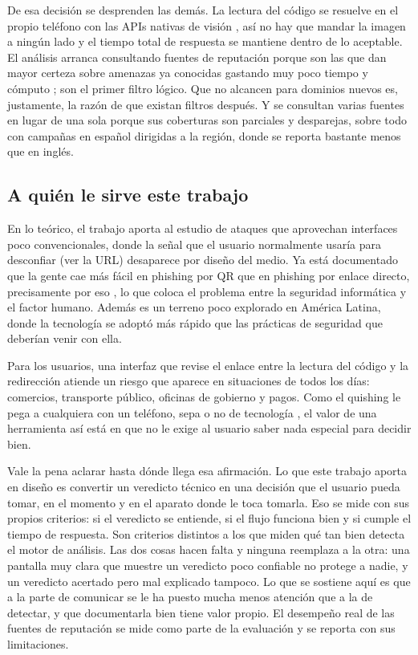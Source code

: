 De esa decisión se desprenden las demás. La lectura del código se resuelve en el
propio teléfono con las APIs nativas de visión
\cite{apple_vndetectbarcodes,google_mlkit_barcode,rousavy_visioncamera}, así no hay
que mandar la imagen a ningún lado y el tiempo total de respuesta se mantiene dentro
de lo aceptable. El análisis arranca consultando fuentes de reputación porque son las
que dan mayor certeza sobre amenazas ya conocidas gastando muy poco tiempo y cómputo
\cite{google_safebrowsing,virustotal_apiv3,phishtank_devinfo}; son el primer filtro
lógico. Que no alcancen para dominios nuevos es, justamente, la razón de que existan
filtros después. Y se consultan varias fuentes en lugar de una sola porque sus
coberturas son parciales y desparejas, sobre todo con campañas en español dirigidas a
la región, donde se reporta bastante menos que en inglés.

\subsection*{A quién le sirve este trabajo}

En lo teórico, el trabajo aporta al estudio de ataques que aprovechan interfaces poco
convencionales, donde la señal que el usuario normalmente usaría para desconfiar (ver
la URL) desaparece por diseño del medio. Ya está documentado que la gente cae más
fácil en phishing por QR que en phishing por enlace directo, precisamente por eso
\cite{vidas2013qrishing,krombholz2014qr}, lo que coloca el problema entre la
seguridad informática y el factor humano. Además es un terreno poco explorado en
América Latina, donde la tecnología se adoptó más rápido que las prácticas de
seguridad que deberían venir con ella.

Para los usuarios, una interfaz que revise el enlace entre la lectura del código y la
redirección atiende un riesgo que aparece en situaciones de todos los días:
comercios, transporte público, oficinas de gobierno y pagos. Como el quishing le pega
a cualquiera con un teléfono, sepa o no de tecnología \cite{vidas2013qrishing}, el
valor de una herramienta así está en que no le exige al usuario saber nada especial
para decidir bien.

Vale la pena aclarar hasta dónde llega esa afirmación. Lo que este trabajo aporta en
diseño es convertir un veredicto técnico en una decisión que el usuario pueda tomar,
en el momento y en el aparato donde le toca tomarla. Eso se mide con sus propios
criterios: si el veredicto se entiende, si el flujo funciona bien y si cumple el
tiempo de respuesta. Son criterios distintos a los que miden qué tan bien detecta el
motor de análisis. Las dos cosas hacen falta y ninguna reemplaza a la otra: una
pantalla muy clara que muestre un veredicto poco confiable no protege a nadie, y un
veredicto acertado pero mal explicado tampoco. Lo que se sostiene aquí es que a la
parte de comunicar se le ha puesto mucha menos atención que a la de detectar, y que
documentarla bien tiene valor propio. El desempeño real de las fuentes de reputación
se mide como parte de la evaluación y se reporta con sus limitaciones.


